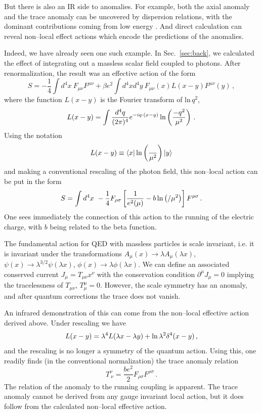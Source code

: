 \documentclass[12pt]{article}
\newcommand{\be}{\begin{equation}}
\newcommand{\ee}{\end{equation}}
\renewcommand{\ln}{\mathop{\rm ln}\nolimits}
\begin{document}
But there is also an IR side to anomalies. For example, both the axial anomaly and the trace anomaly can be uncovered by dispersion relations, with the dominant contributions coming from low energy \cite{Dolgov:1971ri, Horejsi:1985qu, Horejsi:1997yn}. And direct calculation can reveal non--local effect actions which encode the predictions of the anomalies.

Indeed, we have already seen one such example. In Sec.~\ref{sec:back}, we calculated the effect of integrating out a massless scalar field coupled to photons. After renormalization, the result was an effective action of the form
\be
S=-\frac{1}{4}\int d^4x~  F_{\mu\nu}F^{\mu\nu}+\beta e^2 \int d^4x d^4y~
F_{\mu \nu}(x)L(x-y)F^{\mu \nu}(y)\,,
\ee
where the function $L(x-y)$ is the Fourier transform of $\text{ln}\, q^2$,
\begin{equation}
L(x-y) = \int \frac{d^4q}{(2\pi)^4} e^{-iq\cdot (x-y)} \ln \left(\frac{-q^2}{\mu^2}\right)\,.
\label{logbox1}
\end{equation}
Using the notation
\begin{equation}
L(x-y) \equiv \langle x|\ln \left(\frac{\square}{\mu^2}\right)|y\rangle
\label{logbox2}
\end{equation}
and making a conventional rescaling of the photon field, this non--local action can be put in the form
\begin{equation}
S = \int d^4x ~-\frac14 F_{\rho\sigma} \left[\frac{1}{e^2(\mu)} - b \ln \left({\square}/{\mu^2}\right)\right]F^{\rho\sigma} \,.
\label{quasilocal}
\end{equation}
One sees immediately the connection of this action to the running of the electric charge, with $b$ being related to the beta function.

The fundamental action for QED with massless particles is scale invariant, i.e. it is invariant under the transformations  $A_\mu(x) \to \lambda A_\mu(\lambda x)$, $\psi(x)\to \lambda^{3/2}\psi(\lambda x)$, $\phi(x)\to \lambda \phi(\lambda x)$. We can define an associated conserved current $J_\mu = T_{\mu\nu}x^\nu$ with the conservation condition $\partial^\mu J_\mu=0$ implying the tracelessness of $T_{\mu\nu}$, $T^\mu_\mu=0$.  However, the scale symmetry has an anomaly, and after quantum corrections the trace does not vanish.

An infrared demonstration of this can come from the non--local effective action derived above. Under
rescaling we have
\begin{equation}
L(x-y) =\lambda^4 L(\lambda x - \lambda y) +\ln \lambda^2 \delta^4( x - y)\,,
\end{equation}
and the rescaling is no longer a symmetry of the quantum action. Using this, one readily finds (in the conventional normalization) the trace anomaly relation
\begin{equation}
T^\nu_{~\nu}  = \frac{be^2}{2}F_{\rho\sigma}F^{\rho\sigma}  \,.
\end{equation}
The relation of the anomaly to the running coupling is apparent. The trace anomaly cannot be derived from any gauge invariant local action, but it does follow from the calculated non--local effective action.
\end{document}
